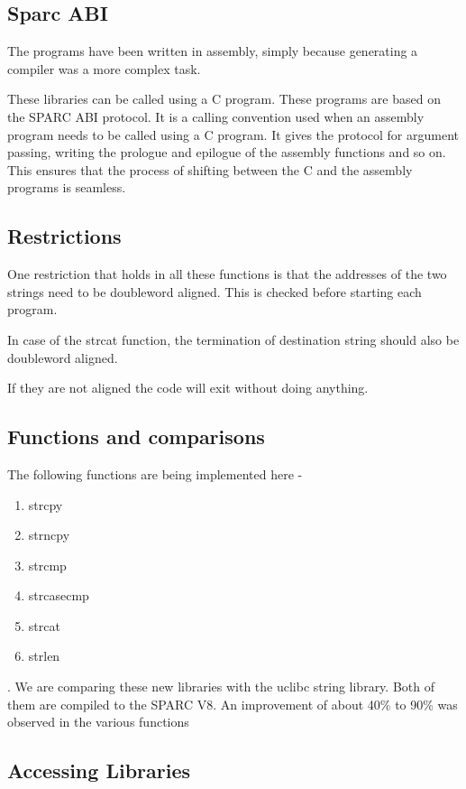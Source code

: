 \documentclass[12pt]{article}
\begin{document}
\subsection{Sparc ABI}
The programs have been written in assembly, simply because generating a compiler was a more complex task. 

These libraries can be called using a C program.
These programs are based on the SPARC ABI protocol. It is a calling convention used when an assembly program needs to be called using a C program.  It gives the protocol for argument passing, writing the prologue and epilogue of the assembly functions and so on. This ensures that the process of shifting between the C and the assembly programs is seamless. 

\subsection{Restrictions}

One restriction that holds in all these functions is that the addresses of the two strings need to be doubleword aligned. This is checked before starting each program.

In case of the strcat function, the termination of destination string should also be doubleword aligned.

If they are not aligned the code will exit without doing anything.

\subsection{Functions and comparisons}
The following functions are being implemented here -
\begin{enumerate}
    \item strcpy
    \item strncpy
    \item strcmp
    \item strcasecmp
    \item strcat
    \item strlen	
\end{enumerate}
.
We are comparing these new libraries with the uclibc string library. Both of them are compiled to the SPARC V8. An improvement of about 40\% to 90\% was observed in the various functions 


\subsection{Accessing Libraries}
\end{document}
